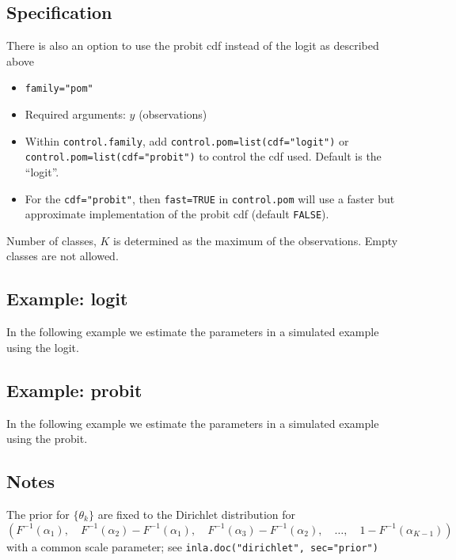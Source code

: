 \documentclass[a4paper,11pt]{article}
\begin{document}
\subsection*{Specification}

There is also an option to use the probit cdf instead of the logit as
described above
\begin{itemize}
\item \texttt{family="pom"}
\item Required arguments: $y$ (observations)
\item Within \texttt{control.family}, add
    \texttt{control.pom=list(cdf="logit")} or \\
    \texttt{control.pom=list(cdf="probit")} to control the cdf used.
    Default is the ``logit''.
\item For the \texttt{cdf="probit"}, then \texttt{fast=TRUE} in
    \texttt{control.pom} will use a faster but approximate
    implementation of the probit cdf (default \texttt{FALSE}).
\end{itemize}
Number of classes, $K$ is determined as the maximum of the
observations. Empty classes are not allowed.




\subsection*{Example: logit}

In the following example we estimate the parameters in a simulated
example using the logit.
{\small

}

\subsection*{Example: probit}

In the following example we estimate the parameters in a simulated
example using the probit.
{\small

}

\subsection*{Notes}

The prior for $\{\theta_k\}$ are fixed to the Dirichlet distribution
for
\begin{displaymath}
    \left(F^{-1}(\alpha_1),\quad
    F^{-1}(\alpha_2)- F^{-1}(\alpha_1),\quad
    F^{-1}(\alpha_3)- F^{-1}(\alpha_2),\quad
    \ldots,\quad
    1-F^{-1}(\alpha_{K-1})\right)
\end{displaymath}    
with a common scale parameter; see \texttt{inla.doc("dirichlet", sec="prior")}
\end{document}
